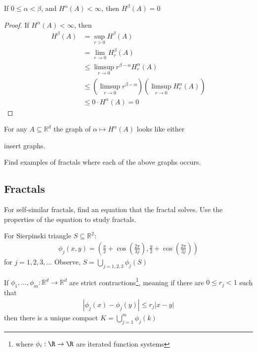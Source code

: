 \begin{lemma}
If $0 \leq \alpha < \beta$, and $H^{\alpha}(A) < \infty$, then $H^{\beta} (A) = 0$
\end{lemma}

\begin{proof}
	If $H^{\alpha}(A) < \infty$, then
	\begin{align*}
		H^{\beta} (A) &= \sup_{r > 0} H^{\beta} (A) \\
					  &= \lim_{r \to 0} H_{r}^{\beta} (A) \\
					  &\leq \limsup_{r \to 0} r^{\beta - \alpha} H_{r}^{\alpha} (A) \\
					  &\leq \left( \limsup_{r \to 0} r^{\beta - \alpha} \right) \left( \limsup_{r \to 0} H_{r}^{\alpha} (A) \right) \\
					  &\leq 0 \cdot H^{\alpha} (A) = 0
	\end{align*}
\end{proof}

For any $A \subseteq \mathbb{R}^d$ the graph of $\alpha \mapsto H^{\alpha} (A)$ looks like either 

insert graphs.

\begin{exercise}
	Find examples of fractals where each of the above graphs occurs.
\end{exercise}

\subsection{Fractals}

For self-similar fractals, find an equation that the fractal solves. Use the properties of the equation to study fractals.

\begin{example}
	For Sierpinski triangle $S \subseteq \mathbb{R}^2$:
	\begin{align*}
		\phi_{j} (x, y) = \left(\frac{x}{2} + \cos\left(\frac{2 \pi}{3 j}\right), \frac{y}{2} + \cos\left(\frac{2 \pi}{3 j}\right) \right)
	\end{align*} for $j = 1,2,3, \ldots$ Observe,
	$S = \bigcup_{j = 1,2,3} \phi_j (S) $
\end{example}

\begin{theorem}
	If $\phi_{1}, \ldots, \phi_{m} : \mathbb{R}^d \to \mathbb{R}^d$ are strict contractions\footnote{where $\phi_i : \R \to \R$ are iterated function systems}, meaning if there are $0 \leq r_{j} < 1$ such that
	\begin{align*}
		| \phi_j (x) - \phi_j (y) | \leq r_{j} |x - y |
	\end{align*} then there is a unique compact
	$K = \bigcup_{j=1}^{m} \phi_{j} (k)$
\end{theorem}

